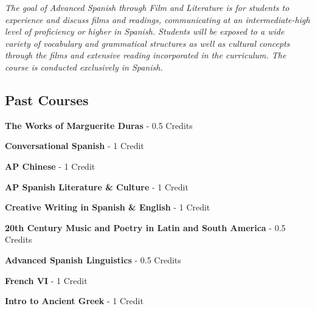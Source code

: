 \vspace{1mm}\emph{The goal of Advanced Spanish through Film and Literature is for students to experience and discuss films and readings, communicating at an intermediate-high level of proficiency or higher in Spanish.  Students will be exposed to a wide variety of vocabulary and grammatical structures as well as cultural concepts through the films and extensive reading incorporated in the curriculum.  The course is conducted exclusively in Spanish. }\\

\subsection{Past Courses}
\noindent\textbf{The Works of Marguerite Duras}  - 0.5 Credits

\vspace{3mm}\noindent\textbf{Conversational Spanish}  - 1 Credit

\vspace{3mm}\noindent\textbf{AP Chinese}  - 1 Credit

\vspace{3mm}\noindent\textbf{AP Spanish Literature \& Culture}  - 1 Credit

\vspace{3mm}\noindent\textbf{Creative Writing in Spanish \& English}  - 1 Credit


\vspace{3mm}\noindent\textbf{20th Century Music and Poetry in Latin and South America}  - 0.5 Credits

\vspace{3mm}\noindent\textbf{Advanced Spanish Linguistics}  - 0.5 Credits

\vspace{3mm}\noindent\textbf{French VI}  - 1 Credit

\vspace{3mm}\noindent\textbf{Intro to Ancient Greek}  - 1 Credit

\vspace{3mm}